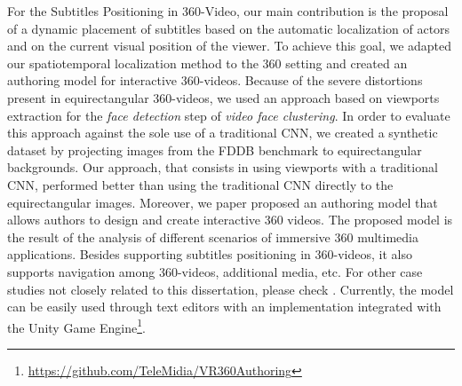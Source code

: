 For the Subtitles Positioning in 360-Video, our main contribution is the proposal of a dynamic placement of subtitles based on the automatic localization of actors and on the current visual position of the viewer. To achieve this goal, we adapted our spatiotemporal localization method to the 360 setting and created an authoring model for interactive 360-videos. Because of the severe distortions present in equirectangular 360-videos, we used an approach based on viewports extraction for the \emph{face detection} step of \emph{video face clustering}. In order to evaluate this approach against the sole use of a traditional CNN, we created a synthetic dataset by projecting images from the FDDB benchmark to equirectangular backgrounds. Our approach, that consists in using viewports with a traditional CNN, performed better than using the traditional CNN directly to the equirectangular images. Moreover, we paper proposed an authoring model that allows authors to design and create
interactive 360 videos. The proposed model is the result of the analysis of different scenarios of immersive 360 multimedia applications. Besides supporting subtitles positioning in 360-videos, it also supports navigation among 360-videos, additional media, etc. For other case studies not closely related to this dissertation, please check \cite{mendes2020authoring}. Currently, the model can be easily used through text editors with an implementation integrated with the Unity Game Engine\footnote{\url{https://github.com/TeleMidia/VR360Authoring}}.